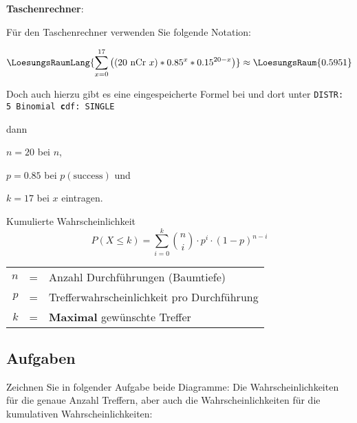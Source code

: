 \newpage
\textbf{Taschenrechner}:

\leserluft

Für den Taschenrechner verwenden Sie folgende Notation: 

$$\LoesungsRaumLang{\sum_{x=0}^{17}\left(( 20 \text{\,\,nCr\,\,} x ) * 0.85^x *
0.15^{20-x}\right)} \approx \LoesungsRaum{0.5951}$$


Doch auch hierzu gibt es eine eingespeicherte Formel
bei
 und dort unter \texttt{DISTR: 5
  Binomial\textbf{\color{red} c}df: SINGLE}

dann

$n=20$ bei $n$,

$p=0.85$ bei $p(\text{success})$ und

$k=17$ bei $x$ eintragen.



\begin{gesetz}{Kumulierte Wahrscheinlichkeit}{}
  $$P(X \le k) = \sum_{i=0}^k {n \choose i} \cdot{} p^i \cdot{} (1-p)^{n-i}$$


\begin{tabular}{rcl}
  $n$ &=& Anzahl Durchführungen (Baumtiefe)\\
  $p$ &=& Trefferwahrscheinlichkeit pro Durchführung\\
  $k$ &=& \textbf{Maximal} gewünschte Treffer\\
\end{tabular}

\end{gesetz}
\newpage

\subsection*{Aufgaben}





Zeichnen Sie in folgender Aufgabe beide Diagramme: Die
Wahrscheinlichkeiten für die genaue Anzahl Treffern, aber auch die
Wahrscheinlichkeiten für die kumulativen Wahrscheinlichkeiten:


